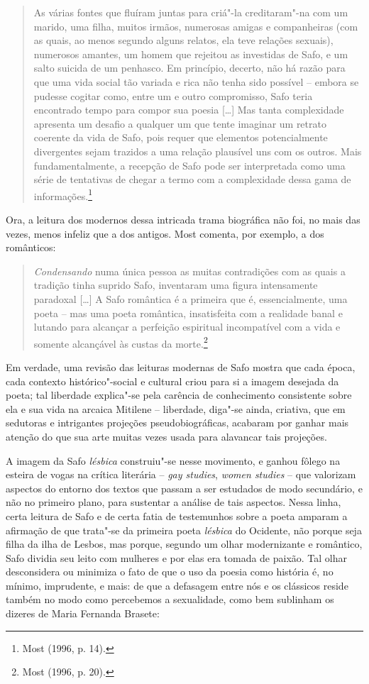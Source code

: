 \begin{quote}
As várias fontes que fluíram juntas para criá"-la creditaram"-na com um marido,
uma filha, muitos irmãos, numerosas amigas e companheiras (com as quais, ao
menos segundo alguns relatos, ela teve relações sexuais), numerosos amantes, um
homem que rejeitou as investidas de Safo, e um salto suicida de um penhasco. Em
princípio, decerto, não há razão para que uma vida social tão variada e rica
não tenha sido possível -- embora se pudesse cogitar como, entre um e outro
compromisso, Safo teria encontrado tempo para compor sua poesia [\ldots{}] Mas tanta
complexidade apresenta um desafio a qualquer um que tente imaginar um retrato
coerente da vida de Safo, pois requer que elementos potencialmente divergentes
sejam trazidos a uma relação plausível uns com os outros. Mais
fundamentalmente, a recepção de Safo pode ser interpretada como uma série de
tentativas de chegar a termo com a complexidade dessa gama de informações.\footnote{ Most (1996, p. 14).}
\end{quote}

Ora, a leitura dos modernos dessa intricada trama biográfica não foi, no mais
das vezes, menos infeliz que a dos antigos. Most comenta, por exemplo,
a dos românticos:

\begin{quote}
\textit{Condensando} numa única pessoa as muitas contradições com as quais a
tradição tinha suprido Safo, inventaram uma figura intensamente paradoxal
[\ldots{}] A Safo romântica é a primeira que é, essencialmente, uma poeta -- mas uma
poeta romântica, insatisfeita com a realidade banal e lutando para alcançar a
perfeição espiritual incompatível com a vida e somente alcançável às custas da
morte.\footnote{ Most (1996, p. 20).}
\end{quote}

Em verdade, uma revisão das leituras modernas de Safo mostra que cada época,
cada contexto histórico"-social e cultural criou para si a imagem desejada da
poeta; tal liberdade explica"-se pela carência de conhecimento consistente sobre
ela e sua vida na arcaica Mitilene -- liberdade, diga"-se ainda, criativa, que
em sedutoras e intrigantes projeções pseudobiográficas, acabaram por
ganhar mais atenção do que sua arte
muitas vezes usada para alavancar tais projeções. 

A imagem da Safo \textit{lésbica} construiu"-se nesse movimento, e ganhou fôlego
na esteira de vogas na crítica literária -- \textit{gay studies}, \textit{women
studies} -- que valorizam aspectos do entorno dos textos que passam a ser
estudados de modo secundário, e não no primeiro plano, para sustentar a análise
de tais aspectos. Nessa linha, certa leitura de Safo e de certa fatia de
testemunhos sobre a poeta amparam a afirmação de que trata"-se da primeira poeta
\textit{lésbica} do Ocidente, não porque seja filha da ilha de Lesbos, mas
porque, segundo um olhar modernizante e romântico, Safo dividia seu leito com mulheres e por
elas era tomada de paixão.
Tal olhar desconsidera ou minimiza o fato de que o uso da poesia como história é, no mínimo, imprudente, e mais: de que a defasagem entre nós e os clássicos reside também no modo como percebemos a sexualidade, como bem sublinham os dizeres de Maria Fernanda Brasete:

